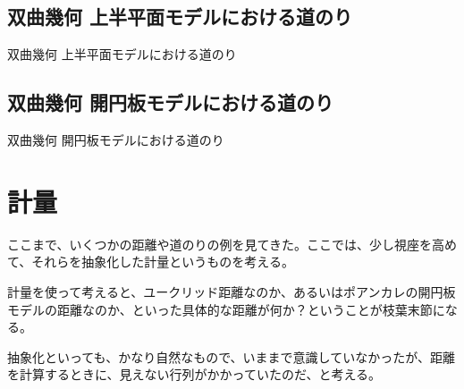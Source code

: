 
\subsection{ 双曲幾何 上半平面モデルにおける道のり }

双曲幾何 上半平面モデルにおける道のり

\newpage


\subsection{ 双曲幾何 開円板モデルにおける道のり }

双曲幾何 開円板モデルにおける道のり

\newpage


\section{ 計量 }

ここまで、いくつかの距離や道のりの例を見てきた。ここでは、少し視座を高めて、それらを抽象化した計量というものを考える。

計量を使って考えると、ユークリッド距離なのか、あるいはポアンカレの開円板モデルの距離なのか、といった具体的な距離が何か？ということが枝葉末節になる。

抽象化といっても、かなり自然なもので、いままで意識していなかったが、距離を計算するときに、見えない行列がかかっていたのだ、と考える。

\newpage
